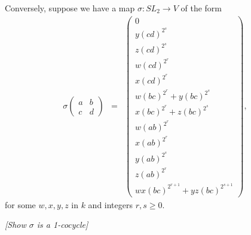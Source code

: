 Conversely, suppose we have a map $\sigma:SL_2 \rightarrow V$ of the form
\begin{eqnarray*}
\sigma\left(\begin{matrix} a & b \\ c & d \end{matrix} \right) &=& 
\left(\begin{matrix}
0 \\
y(cd)^{2^s} \\
z(cd)^{2^s} \\
w(cd)^{2^r} \\
x(cd)^{2^r} \\
w(bc)^{2^r} + y(bc)^{2^s} \\
x(bc)^{2^r} + z(bc)^{2^s} \\
w(ab)^{2^r} \\
x(ab)^{2^r}  \\
y(ab)^{2^s} \\
z(ab)^{2^r} \\
wx(bc)^{2^{r+1}} + yz(bc)^{2^{s+1}}
\end{matrix}\right),
\end{eqnarray*}
for some $w,x,y,z$ in $k$ and integers $r,s\geq 0$. 

\emph{[Show $\sigma$ is a 1-cocycle]}

